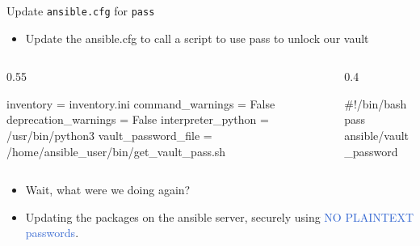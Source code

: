 \documentclass[aspectratio=169,12pt]{beamer}
\begin{document}
\begin{frame}[fragile]{Update \texttt{ansible.cfg} for \texttt{pass}}
\begin{itemize}
  \item Update the ansible.cfg to call a script to use pass to unlock our vault
\end{itemize}
\vspace{0.2cm}
\begin{columns}[T]
\begin{column}{0.55\textwidth}
\begin{codeini}
[defaults]
inventory = inventory.ini
command_warnings = False
deprecation_warnings = False
interpreter_python = /usr/bin/python3
vault_password_file =
    /home/ansible_user/bin/get_vault_pass.sh
\end{codeini}
\end{column}
\begin{column}{0.4\textwidth}
\begin{codebash}
#!/bin/bash
pass ansible/vault_password
\end{codebash}
\end{column}
\end{columns}
\vspace{0.3cm}
\begin{itemize}
  \item Wait, what were we doing again?
  \item Updating the packages on the ansible server, securely using \textcolor{highlight}{NO PLAINTEXT passwords}.
\end{itemize}
\end{frame}
\end{document}
